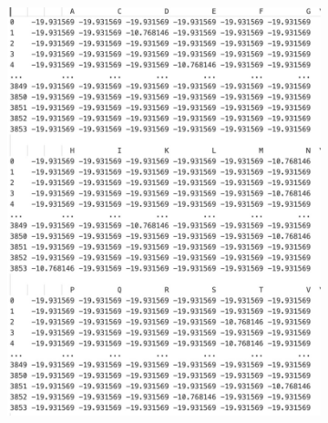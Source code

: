             \begin{figure}[H]
                \centering
                \begin{subfigure}[b]{0.4\textwidth}
                    \includegraphics[width=\textwidth]{images/pssm1.jpg}
                    \label{fig:pssm1}
                \end{subfigure}
                \hfill %
                \begin{subfigure}[b]{0.4\textwidth}

\end{subfigure}
\end{figure}
